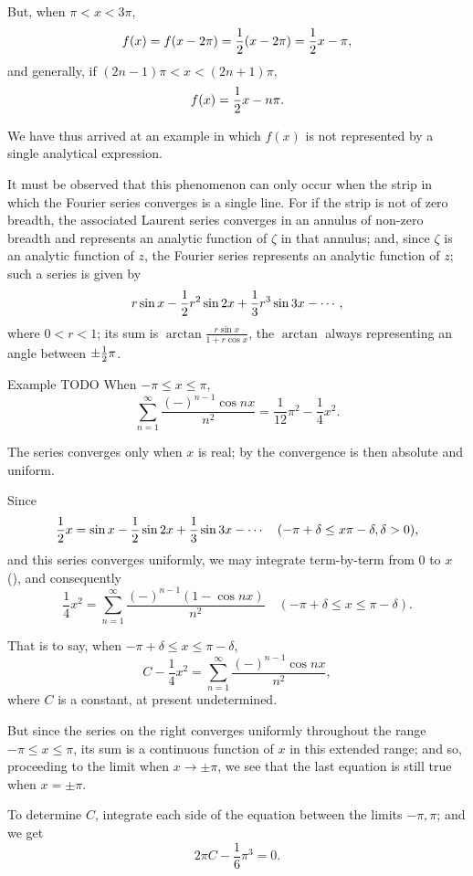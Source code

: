 But, when $\pi < x < 3\pi$,
$$
f(x)
=
f(x - 2\pi)
=
\frac{1}{2} (x - 2\pi)
=
\frac{1}{2} x - \pi,
$$
and generally, if $(2n - 1) \pi < x < (2n + 1) \pi$,
$$
f(x) = \frac{1}{2} x - n \pi.
$$

We have thus arrived at an example in which $f(x)$ is
not represented by a single analytical expression.

It must be observed that this phenomenon can only occur when the
strip in which the Fourier series converges is a single line.
For if the strip is not of zero breadth, the associated Laurent
series converges in an annulus of non-zero breadth and represents an
analytic function of $\zeta$ in that annulus; and, since
$\zeta$ is an analytic function of $z$, the Fourier series
represents an analytic function of $z$; such a series is given by
$$
r \sin x
- \frac{1}{2} r^{2} \sin 2x
+ \frac{1}{3} r^{3} \sin 3x
- \cdots,
$$
where $0 < r < 1$; its sum is
$\arctan \frac{r \sin x}{1 + r \cos x}$, the $\arctan$ always
representing an angle between $\pm \frac{1}{2} \pi$.

Example TODO
When $-\pi \leq x \leq \pi$,
$$
\sum_{n=1}^{\infty}
\frac{(-)^{n-1} \cos nx}{n^{2}}
=
\frac{1}{12} \pi^{2}
-
\frac{1}{4} x^{2}.
$$

The series converges only when $x$ is real; by
 the convergence is then
absolute and uniform.

Since
$$
\frac{1}{2} x
=
\sin x
- \frac{1}{2} \sin 2x
+ \frac{1}{3} \sin 3x
- \cdots
\quad
(-\pi + \delta \leq x \pi - \delta,
\delta > 0),
$$
and this series converges uniformly, we may integrate
term-by-term from $0$ to $x$ (),
and consequently
$$
\frac{1}{4} x^{2}
=
\sum_{n=1}^{\infty}
\frac{(-)^{n-1} (1 - \cos nx)}{n^{2}}
\quad
(-\pi + \delta \leq x \leq \pi - \delta).
$$
%
%

That is to say, when $-\pi + \delta \leq x \leq \pi - \delta$,
$$
C - \frac{1}{4} x^{2}
=
\sum_{n=1}^{\infty} \frac{(-)^{n-1} \cos nx}{n^{2}},
$$
where $C$ is a constant, at present undetermined.

But since the series on the right converges uniformly throughout the
range $-\pi \leq x \leq \pi$, its sum is a continuous function of $x$ in this
extended range; and so, proceeding to the limit when
$x \rightarrow \pm \pi$, we see
that the last equation is still true when $x = \pm \pi$.

To determine $C$, integrate each side of the equation  between
the limits $-\pi, \pi$; and we get
$$
2 \pi C - \frac{1}{6} \pi^{3} = 0.
$$

